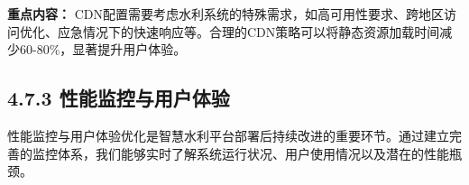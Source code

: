 \begin{Shaded}
\begin{Highlighting}[]
  \NormalTok{() \{}
     \OperatorTok{=}\NormalTok{ [}
\NormalTok{      \{ }\OperatorTok{:} \OperatorTok{,} \OperatorTok{:} \NormalTok{ \}}\OperatorTok{,}
\NormalTok{      \{ }\OperatorTok{:} \OperatorTok{,} \OperatorTok{:} \NormalTok{ \}}
\NormalTok{    ]}
     \OperatorTok{=} \NormalTok{[}\NormalTok{]}
\NormalTok{  \}}
  
   \NormalTok{() \{}
    \NormalTok{ \{}
      \OperatorTok{=}  \NormalTok{(} \OperatorTok{+} \NormalTok{)}
\NormalTok{    \} }\NormalTok{ \{}
       
\NormalTok{    \}}
\NormalTok{  \}}
\NormalTok{\}}
\end{Highlighting}
\end{Shaded}

\textbf{重点内容：} CDN配置需要考虑水利系统的特殊需求，如高可用性要求、跨地区访问优化、应急情况下的快速响应等。合理的CDN策略可以将静态资源加载时间减少60-80\%，显著提升用户体验。

\subsection{4.7.3 性能监控与用户体验}\label{ux6027ux80fdux76d1ux63a7ux4e0eux7528ux6237ux4f53ux9a8c}

性能监控与用户体验优化是智慧水利平台部署后持续改进的重要环节。通过建立完善的监控体系，我们能够实时了解系统运行状况、用户使用情况以及潜在的性能瓶颈。

